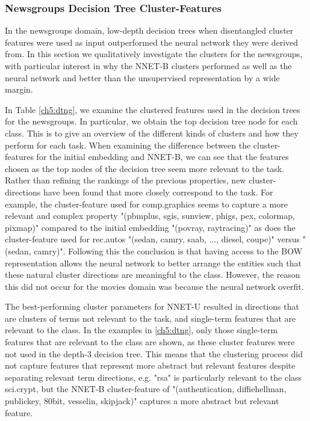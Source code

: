 \subsubsection{Newsgroups Decision Tree Cluster-Features}\label{ch5:newsgroupsquant}

In the newsgroups domain, low-depth decision trees when disentangled cluster features were used as input outperformed the neural network they were derived from. In this section we qualitatively investigate the clusters for the newsgroups, with particular interest in why the NNET-B clusters performed as well as the neural network and better than the unsupervised representation by a wide margin.

In Table \ref{ch5:dtng}, we examine the clustered features used in the decision trees for the newsgroups. In particular, 
we obtain the top decision tree node for each class. This is to give an overview of the different kinds of clusters and how they perform for each task. When examining the difference between the cluster-features for the initial embedding and NNET-B, we can see that the features chosen as the top nodes of the decision tree seem more relevant to the task. Rather than refining the rankings of the previous properties, new cluster-directions have been found that more closely correspond to the task. For example, the cluster-feature used for comp.graphics seems to capture a more relevant and complex property  "(pbmplus, sgis, sunview, phigs, pex, colormap, pixmap)" compared to the initial embedding "(povray, raytracing)" as does the cluster-feature used for rec.autos "(sedan, camry, saab, ..., diesel, coupe)" versus "(sedan, camry)". Following this the conclusion is that having access to the BOW representation allows the neural network to better arrange the entities such that these natural cluster directions are meaningful to the class. However, the reason this did not occur for the movies domain was because the neural network overfit. 

The best-performing cluster parameters for  NNET-U resulted in directions that are clusters of terms not relevant to the task, and single-term features that are relevant to the class. In the examples in \ref{ch5:dtng}, only those single-term features that are relevant to the class are shown, as these  cluster features were not used in the depth-3 decision tree. This means that the clustering process did not capture features that represent more abstract but relevant features despite separating relevant term directions, e.g.  "rsa" is particularly relevant to the class sci.crypt, but the NNET-B cluster-feature of  "(authentication, diffiehellman, publickey, 80bit, vesselin, skipjack)" captures a more abstract but relevant feature.  %




